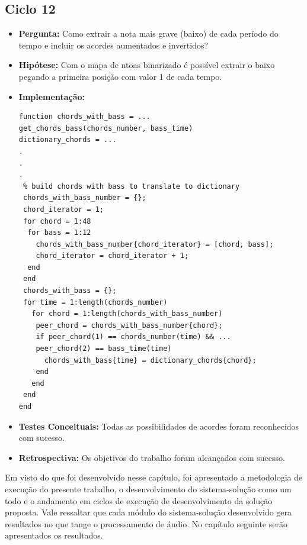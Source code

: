 \subsection{Ciclo 12}
\begin{itemize}
\item \textbf{Pergunta:} Como extrair a nota mais grave (baixo) de cada período do tempo e incluir os acordes aumentados e invertidos?
\item \textbf{Hipótese:} Com o mapa de ntoas binarizado é possível extrair o baixo pegando a primeira posição com valor 1 de cada tempo.
\item \textbf{Implementação:}
\begin{lstlisting}
function chords_with_bass = ...
get_chords_bass(chords_number, bass_time)
dictionary_chords = ...
.
.
.
 % build chords with bass to translate to dictionary
 chords_with_bass_number = {};
 chord_iterator = 1;
 for chord = 1:48
  for bass = 1:12
    chords_with_bass_number{chord_iterator} = [chord, bass];
    chord_iterator = chord_iterator + 1;
  end
 end
 chords_with_bass = {};
 for time = 1:length(chords_number)
   for chord = 1:length(chords_with_bass_number)
    peer_chord = chords_with_bass_number{chord};
    if peer_chord(1) == chords_number(time) && ...
    peer_chord(2) == bass_time(time)
      chords_with_bass{time} = dictionary_chords{chord};
    end
   end
 end
end
\end{lstlisting}
\item \textbf{Testes Conceituais:} Todas as possibilidades de acordes foram reconhecidos com sucesso.
\item \textbf{Retrospectiva:} Os objetivos do trabalho foram alcançados com sucesso.
\end{itemize}

Em visto do que foi desenvolvido nesse capítulo, foi apresentado a metodologia de execução do presente trabalho, o desenvolvimento do sistema-solução como um todo e o andamento em ciclos de execução de desenvolvimento da solução proposta. Vale ressaltar que cada módulo do sistema-solução desenvolvido gera resultados no que tange o processamento de áudio. No capítulo seguinte serão apresentados os resultados. 